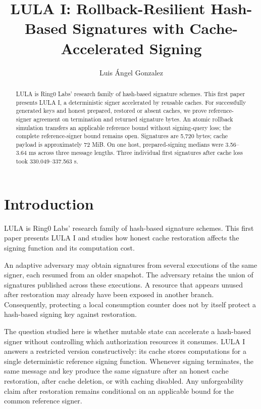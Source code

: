 \documentclass[a4paper,envcountsame,runningheads]{llncs}
\begin{document}
\raggedbottom
\title{LULA I: Rollback-Resilient Hash-Based Signatures with Cache-Accelerated Signing}
\author{Luis \'Angel Gonzalez}
\maketitle
\thispagestyle{plain}
\begin{abstract}
LULA is Ring0 Labs' research family of hash-based signature schemes. This first paper presents LULA I, a deterministic signer accelerated by reusable caches. For successfully generated keys and honest prepared, restored or absent caches, we prove reference-signer agreement on termination and returned signature bytes. An atomic rollback simulation transfers an applicable reference bound without signing-query loss; the complete reference-signer bound remains open. Signatures are 5,720 bytes; cache payload is approximately 72 MiB. On one host, prepared-signing medians were 3.56--3.64 ms across three message lengths. Three individual first signatures after cache loss took 330.049--337.563 s.
\end{abstract}

\section{Introduction}\label{sec:introduction}
LULA is Ring0 Labs' research family of hash-based signature schemes. This first paper presents LULA I and studies how honest cache restoration affects the signing function and its computation cost.

An adaptive adversary may obtain signatures from several executions of the same signer, each resumed from an older snapshot. The adversary retains the union of signatures published across these executions. A resource that appears unused after restoration may already have been exposed in another branch. Consequently, protecting a local consumption counter does not by itself protect a hash-based signing key against restoration.

The question studied here is whether mutable state can accelerate a hash-based signer without controlling which authorization resources it consumes. LULA I answers a restricted version constructively: its cache stores computations for a single deterministic reference signing function. Whenever signing terminates, the same message and key produce the same signature after an honest cache restoration, after cache deletion, or with caching disabled. Any unforgeability claim after restoration remains conditional on an applicable bound for the common reference signer.
\end{document}
